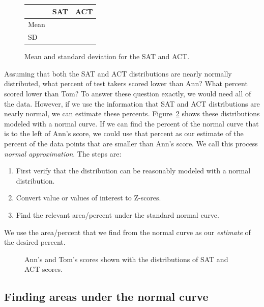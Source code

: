   \begin{figure}[h]
\centering
\begin{tabular}{l r r}
  \hline
  & SAT & ACT \\
  \hline
  Mean \hspace{0.3cm} & \satmean{} & \actmean{} \\
  SD & \satsd{} & \actsd{} \\
  \hline
\end{tabular}
\caption{Mean and standard deviation for the SAT and ACT.}
\label{satACTstats}
\end{figure}

Assuming that both the SAT and ACT distributions are nearly normally distributed, what percent of test takers scored lower than Ann?  What percent scored lower than Tom?  To answer these question exactly, we would need all of the data.  However, if we use the information that SAT and ACT distributions are nearly normal, we can estimate these percents.  Figure~\ref{satActNormals} shows these distributions modeled with a normal curve.  If we can find the percent of the normal curve that is to the left of Ann's score, we could use that percent as our estimate of the percent of the data points that are smaller than Ann's score.  We call this process \emph{normal approximation}.  The steps are:
\begin{enumerate}
\item First verify that the distribution can be reasonably modeled with a normal distribution.
\item Convert value or values of interest to Z-scores.  
\item Find the relevant area/percent under the standard normal curve.
\end{enumerate}
We use the area/percent that we find from the normal curve as our \emph{estimate} of the desired percent. 



\begin{figure}[h]
  \centering
  \caption{Ann's and Tom's scores shown with the distributions
      of SAT and ACT scores.}
  \label{satActNormals}
\end{figure}




\B{\newpage}

\subsection{Finding areas under the normal curve}

